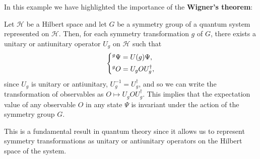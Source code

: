 In this example we have highlighted the importance of the \textbf{Wigner's theorem}:
\begin{theorem}
    Let \(\mathcal{H}\) be a Hilbert space and let \(G\) be a symmetry group of a quantum system represented on \(\mathcal{H}\). Then, for each symmetry transformation \(g\) of \(G\), there exists a unitary or antiunitary operator \(U_g\) on \(\mathcal{H}\) such that
    \begin{equation}
        \begin{dcases}
            ^g \Psi = U(g) \Psi,        \\
            ^g O = U_g O U_g^{\dagger}, \\
        \end{dcases}
        \label{eq:unitary_representation_symmetry_group_definition}
    \end{equation}
    since \(U_g\) is unitary or antiunitary, \(U_g^{-1} = U_g^{\dagger}\), and so we can write the transformation of observables as \(O \mapsto U_g O U_g^{\dagger}\). This implies that the expectation value of any observable \(O\) in any state \(\Psi\) is invariant under the action of the symmetry group \(G\).
\end{theorem}
This is a fundamental result in quantum theory since it allows us to represent symmetry transformations as unitary or antiunitary operators on the Hilbert space of the system.

